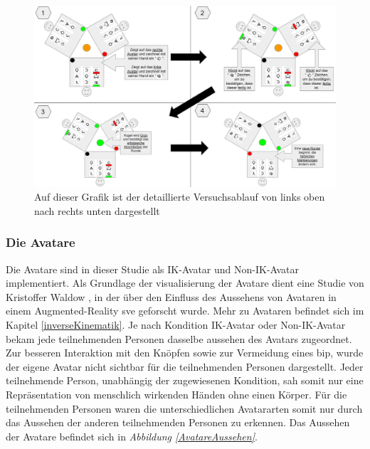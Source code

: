 \documentclass[a4paper,11pt]{article}%
\renewcommand{\\}{\vspace*{0.5\baselineskip} \newline}
\begin{document}
	\begin{figure}[h]
		\begin{footnotesize}
		\centering
			\includegraphics[scale=0.30]{Abbildungen/DetaillierterVersuchsablauf.JPG}
			
			\caption[Abbildung 1]{Auf dieser Grafik ist der detaillierte Versuchsablauf von links oben nach rechts unten dargestellt}
			\label{DetaillierterVersuchsablauf}
		\end{footnotesize}
	\end{figure}

	\subsubsection{Die Avatare}
\label{IKNIK}
Die Avatare sind in dieser Studie als \dq{}IK-Avatar\dq{} und \dq{}Non-IK-Avatar\dq{} implementiert. Als Grundlage der visualisierung der Avatare dient eine Studie von Kristoffer Waldow \cite{waldow2019investigating}, in der über den Einfluss des Aussehens von Avataren in einem Augmented-Reality \ac{sve} geforscht wurde. 
Mehr zu Avataren befindet sich im Kapitel \ref{inverseKinematik}.
Je nach Kondition \dq{}IK-Avatar\dq{} oder \dq{}Non-IK-Avatar\dq{} bekam jede teilnehmenden Personen dasselbe aussehen des Avatars zugeordnet. Zur besseren Interaktion mit den Knöpfen sowie zur Vermeidung eines \ac{bip}, wurde der eigene Avatar nicht sichtbar für die teilnehmenden Personen dargestellt. Jeder teilnehmende Person, unabhängig der zugewiesenen Kondition, sah somit nur eine Repräsentation von menschlich wirkenden Händen ohne einen Körper. Für die teilnehmenden Personen waren die unterschiedlichen Avatararten somit nur durch das Aussehen der \dq{}anderen\dq{} teilnehmenden Personen zu erkennen. Das Aussehen der Avatare befindet sich in \textit{Abbildung \ref{AvatareAussehen}}.
\end{document}

